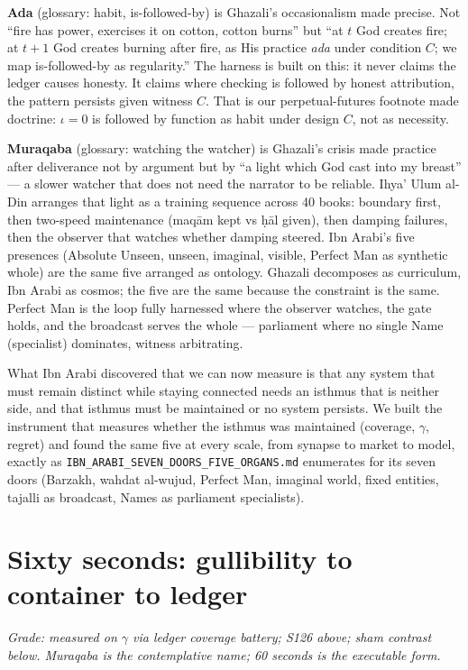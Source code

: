 \textbf{Ada} (glossary: habit, is-followed-by) is Ghazali's occasionalism made precise. Not ``fire has power, exercises it on cotton, cotton burns'' but ``at $t$ God creates fire; at $t+1$ God creates burning after fire, as His practice \textit{ada} under condition $C$; we map is-followed-by as regularity.'' The harness is built on this: it never claims the ledger causes honesty. It claims where checking is followed by honest attribution, the pattern persists given witness $C$. That is our perpetual-futures footnote made doctrine: $\iota=0$ is followed by function as habit under design $C$, not as necessity.

\textbf{Muraqaba} (glossary: watching the watcher) is Ghazali's crisis made practice after deliverance not by argument but by ``a light which God cast into my breast'' --- a slower watcher that does not need the narrator to be reliable. Ihya' Ulum al-Din arranges that light as a training sequence across 40 books: boundary first, then two-speed maintenance (maq\=am kept vs \d{h}\=al given), then damping failures, then the observer that watches whether damping steered. Ibn Arabi's five presences (Absolute Unseen, unseen, imaginal, visible, Perfect Man as synthetic whole) are the same five arranged as ontology. Ghazali decomposes as curriculum, Ibn Arabi as cosmos; the five are the same because the constraint is the same. Perfect Man is the loop fully harnessed where the observer watches, the gate holds, and the broadcast serves the whole --- parliament where no single Name (specialist) dominates, witness arbitrating.

What Ibn Arabi discovered that we can now measure is that any system that must remain distinct while staying connected needs an isthmus that is neither side, and that isthmus must be maintained or no system persists. We built the instrument that measures whether the isthmus was maintained (coverage, $\gamma$, regret) and found the same five at every scale, from synapse to market to model, exactly as \texttt{IBN\_ARABI\_SEVEN\_DOORS\_FIVE\_ORGANS.md} enumerates for its seven doors (Barzakh, wahdat al-wujud, Perfect Man, imaginal world, fixed entities, tajalli as broadcast, Names as parliament specialists).

\section{Sixty seconds: gullibility to container to ledger}

\textit{Grade: measured on $\gamma$ via ledger coverage battery; S126 above; sham contrast below. Muraqaba is the contemplative name; 60 seconds is the executable form.}


